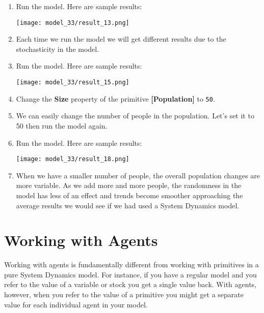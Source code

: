 \documentclass[]{memoir}
\makeatletter
\def\maxwidth{\ifdim\Gin@nat@width>\linewidth\linewidth
\else\Gin@nat@width\fi}
\let\Oldincludegraphics\includegraphics
\renewcommand{\includegraphics}[1]{\Oldincludegraphics[width=\maxwidth]{#1}}
\newcommand{\p}[1]{\textbf{{[}#1{]}}}
\newcommand{\e}[1]{\texttt{#1}}
\renewcommand{\a}[1]{\textbf{#1}}
\makeatother
\begin{document}
\begin{oframed}
\begin{enumerate}
\item Run the model. Here are sample results:\par \begin{minipage}{\linewidth}  \centering \texttt{[image: model\_33/result\_13.png]}
\end{minipage}
\item 

Each time we run the model we will get different results due to the stochasticity in the model.


\item Run the model. Here are sample results:\par \begin{minipage}{\linewidth}  \centering \texttt{[image: model\_33/result\_15.png]}
\end{minipage}
\item  Change the \a{Size} property of the primitive \p{Population} to \e{50}.
\item 

We can easily change the number of people in the population. Let's set it to 50 then run the model again.


\item Run the model. Here are sample results:\par \begin{minipage}{\linewidth}  \centering \texttt{[image: model\_33/result\_18.png]}
\end{minipage}
\item 

When we have a smaller number of people, the overall population changes are more variable. As we add more and more people, the randomness in the model has less of an effect and trends become smoother approaching the average results we would see if we had used a System Dynamics model.



\end{enumerate} \end{oframed}

\section{Working with Agents}

Working with agents is fundamentally different from working with
primitives in a pure System Dynamics model. For instance, if you have a
regular model and you refer to the value of a variable or stock you get
a single value back. With agents, however, when you refer to the value
of a primitive you might get a separate value for each individual agent
in your model.
\end{document}
